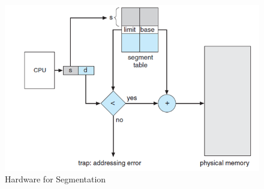\documentclass{article}
\theoremstyle{plain}
\theoremstyle{definition}
\begin{document}
\begin{figure}[!h]
    \centering
    \includegraphics[scale=0.8]{os4.png}
    \caption{Hardware for Segmentation}
    \label{fig:my_label_4}
\end{figure}
\end{document}
